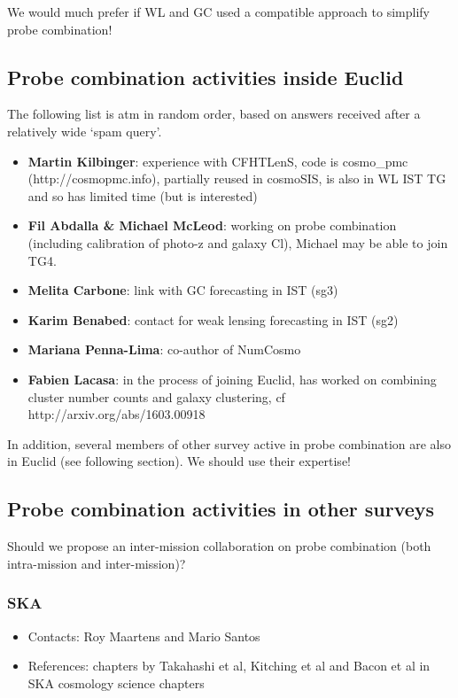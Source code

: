 We would much prefer if WL and GC used a compatible approach to simplify probe combination!

\subsection{Probe combination activities inside Euclid}

The following list is atm in random order, based on answers received after
a relatively wide `spam query'.

\begin{itemize}
\item {\bf Martin Kilbinger}: experience with CFHTLenS, code is cosmo\_pmc (http://cosmopmc.info), partially reused in cosmoSIS, is also in WL IST TG and so has limited time (but is interested)
\item {\bf Fil Abdalla \& Michael McLeod}: working on probe combination (including calibration of photo-z and galaxy Cl), Michael may be able to join TG4.
\item {\bf Melita Carbone}: link with GC forecasting in IST (sg3)
\item {\bf Karim Benabed}: contact for weak lensing forecasting in IST (sg2)
\item {\bf Mariana Penna-Lima}: co-author of NumCosmo
\item {\bf Fabien Lacasa}: in the process of joining Euclid, has worked on combining cluster number counts and galaxy clustering, cf http://arxiv.org/abs/1603.00918
\end{itemize}

In addition, several members of other survey active in probe combination are also in Euclid (see following section).
We should use their expertise!

\subsection{Probe combination activities in other surveys}

Should we propose an inter-mission collaboration on probe combination (both intra-mission and inter-mission)?

\subsubsection{SKA}

\begin{itemize}
\item Contacts: Roy Maartens and Mario Santos
\item References: chapters by Takahashi et al, Kitching et al and Bacon et al in SKA cosmology science chapters
\end{itemize}

